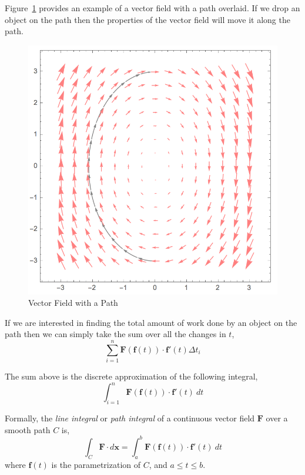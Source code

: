 \documentclass[12pt]{article}
\begin{document}
 Figure~\ref{fig:vectorfieldexample2} provides an example of a vector field with a path overlaid. If we drop an object on the path then the properties of the vector field will move it along the path. \\

\begin{figure}[h!]
\centering
\caption{Vector Field with a Path}
\label{fig:vectorfieldexample2}
\indent\includegraphics[scale=0.7]{vector_field_example2.png}
\end{figure}

 If we are interested in finding the total amount of work done by an object on the path then we can simply take the sum over all the changes in $t$,
\[
\sum_{i=1}^{n} \mathbf{F}(\mathbf{f}(t)) \cdot \mathbf{f}'(t)\Delta t_i
\]

 The sum above is the discrete approximation of the following integral,
\[
\int_{i=1}^{n} \mathbf{F}(\mathbf{f}(t)) \cdot \mathbf{f}'(t)\  dt
\]

 Formally, the \emph{line integral} or \emph{path integral} of a continuous vector field $\mathbf{F}$ over a smooth path $C$ is,
\[
\int_{C} \mathbf{F}\cdot d\mathbf{x} = \int_{a}^{b} \mathbf{F}(\mathbf{f}(t)) \cdot \mathbf{f}'(t)\  dt
\]
where $\mathbf{f}(t)$ is the parametrization of $C$, and $a\leq t\leq b$. \\
\end{document}
